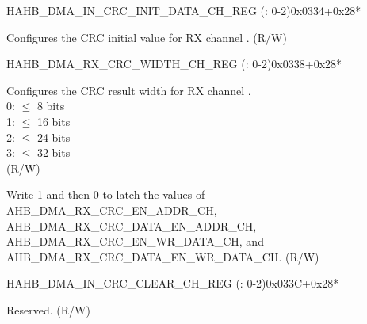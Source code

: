\begin{register}{H}{AHB\_DMA\_IN\_CRC\_INIT\_DATA\_CH\_REG (: 0-2)}{0x0334+0x28*}\label{regdesc:AHBDMAINCRCINITDATACHNREG}
%
\regnewline%
\begin{regdesc}\begin{reglist}
\label{fielddesc:AHBDMAINCRCINITDATACHN}\item [AHB\_DMA\_IN\_CRC\_INIT\_DATA\_CH\regindex{n}] Configures the CRC initial value for RX channel . (R/W)
\end{reglist}\end{regdesc}
\end{register}


\begin{register}{H}{AHB\_DMA\_RX\_CRC\_WIDTH\_CH\_REG (: 0-2)}{0x0338+0x28*}\label{regdesc:AHBDMARXCRCWIDTHCHNREG}
%
%
%
\regnewline%
\begin{regdesc}\begin{reglist}
\label{fielddesc:AHBDMARXCRCWIDTHCHN}\item [AHB\_DMA\_RX\_CRC\_WIDTH\_CH\regindex{n}] Configures the CRC result width for RX channel .\\
0: $\leq$ 8 bits\\
1: $\leq$ 16 bits\\
2: $\leq$ 24 bits\\
3: $\leq$ 32 bits\\ (R/W)
\label{fielddesc:AHBDMARXCRCLAUTCHFLGACHN}\item [AHB\_DMA\_RX\_CRC\_LAUTCH\_FLGA\_CH\regindex{n}] Write 1 and then 0 to latch the values of AHB\_DMA\_RX\_CRC\_EN\_ADDR\_CH, AHB\_DMA\_RX\_CRC\_DATA\_EN\_ADDR\_CH, AHB\_DMA\_RX\_CRC\_EN\_WR\_DATA\_CH, and AHB\_DMA\_RX\_CRC\_DATA\_EN\_WR\_DATA\_CH. (R/W)
\end{reglist}\end{regdesc}
\end{register}


\begin{register}{H}{AHB\_DMA\_IN\_CRC\_CLEAR\_CH\_REG (: 0-2)}{0x033C+0x28*}\label{regdesc:AHBDMAINCRCCLEARCHNREG}
%
%
\regnewline%
\begin{regdesc}\begin{reglist}
\label{fielddesc:AHBDMAINCRCCLEARCHNREG}\item [AHB\_DMA\_IN\_CRC\_CLEAR\_CH\regindex{n}\_REG] Reserved. (R/W)
\end{reglist}\end{regdesc}
\end{register}


